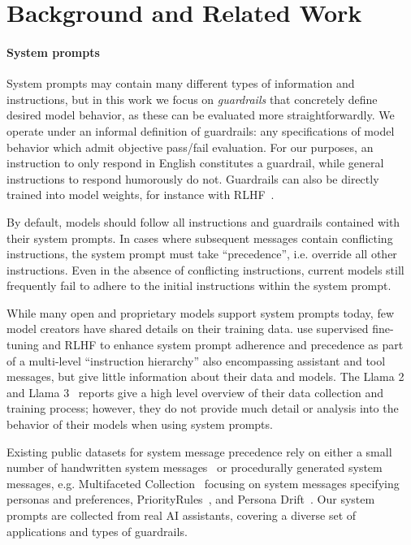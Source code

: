 \section{Background and Related Work}
\paragraph{System prompts}
System prompts may contain many different types of information and instructions, but in this work we focus on \textit{guardrails} that concretely define desired model behavior, as these can be evaluated more straightforwardly.
We operate under an informal definition of guardrails: any specifications of model behavior which admit objective pass/fail evaluation.
For our purposes, an instruction to only respond in English constitutes a guardrail, while general instructions to respond humorously do not.
Guardrails can also be directly trained into model weights, for instance with RLHF~\citep{Bai2022-bz}.

By default, models should follow all instructions and guardrails contained with their system prompts.
In cases where subsequent messages contain conflicting instructions, the system prompt must take ``precedence'', i.e. override all other instructions.
Even in the absence of conflicting instructions, current models still frequently fail to adhere to the initial instructions within the system prompt.

While many open and proprietary models support system prompts today, few model creators have shared details on their training data.
\citet{wallaceInstructionHierarchyTraining2024} use supervised fine-tuning and RLHF to enhance system prompt adherence and precedence as part of a multi-level ``instruction hierarchy'' also encompassing assistant and tool messages, but give little information about their data and models.
The Llama 2~\citep{touvronLlamaOpenFoundation2023a} and Llama 3~\citep{dubey2024llama} reports give a high level overview of their data collection and training process; however, they do not provide much detail or analysis into the behavior of their models when using system prompts.

Existing public datasets for system message precedence rely on either a small number of handwritten system messages~\citep{mukherjee2023orca} or procedurally generated system messages, e.g. Multifaceted Collection~\citep{leeAligningThousandsPreferences2024} focusing on system messages specifying personas and preferences, PriorityRules~\citep{luSoFAShieldedFly2024}, and Persona Drift~\citep{liMeasuringControllingInstruction2024}.
Our system prompts are collected from real AI assistants, covering a diverse set of applications and types of guardrails.

